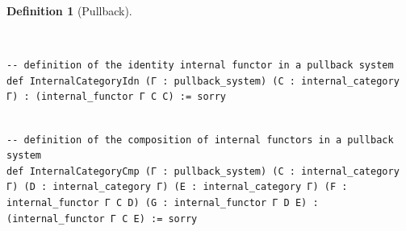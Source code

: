 \documentclass{book}
\theoremstyle{definition}
\newtheorem{definition}{Definition}
\newcounter{lcounter}
\begin{document}
\begin{definition}[Pullback]
\begin{center}
\begin{tcolorbox}[width=5in,colback={white},title={\begin{center}\texttt{Lean \thelcounter} \addtocounter{lcounter}{1}  \end{center}},colbacktitle=Blue,coltitle=black]
\begin{verbatim}
\end{verbatim}
\end{tcolorbox}
\end{center}


\begin{center}
\begin{tcolorbox}[width=5in,colback={white},title={\begin{center}\texttt{Lean \thelcounter} \addtocounter{lcounter}{1}  \end{center}},colbacktitle=Blue,coltitle=black]
\begin{verbatim}

-- definition of the identity internal functor in a pullback system
def InternalCategoryIdn (Γ : pullback_system) (C : internal_category Γ) : (internal_functor Γ C C) := sorry

\end{verbatim}
\end{tcolorbox}
\end{center}

\begin{center}
\begin{tcolorbox}[width=5in,colback={white},title={\begin{center}\texttt{Lean \thelcounter} \addtocounter{lcounter}{1}  \end{center}},colbacktitle=Blue,coltitle=black]
\begin{verbatim}

-- definition of the composition of internal functors in a pullback system
def InternalCategoryCmp (Γ : pullback_system) (C : internal_category Γ) (D : internal_category Γ) (E : internal_category Γ) (F : internal_functor Γ C D) (G : internal_functor Γ D E) : (internal_functor Γ C E) := sorry

\end{verbatim}
\end{tcolorbox}
\end{center}

\begin{center}
\begin{tcolorbox}[width=5in,colback={white},title={\begin{center}\texttt{Lean \thelcounter} \addtocounter{lcounter}{1}  \end{center}},colbacktitle=Blue,coltitle=black]
\begin{verbatim}


\end{verbatim}
\end{tcolorbox}
\end{center}
\end{definition}
\end{document}
